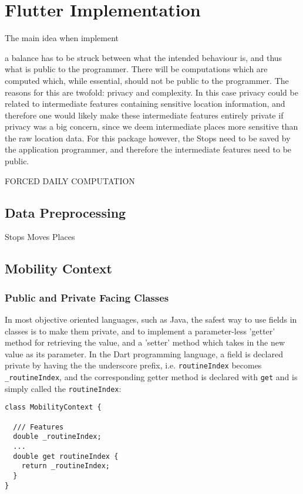 \section{Flutter Implementation}
The main idea when implement

a balance has to be struck between what the intended behaviour is, and thus what is public to the programmer. There will be computations which are computed which, while essential, should not be public to the programmer. The reasons for this are twofold: privacy and complexity. In this case privacy could be related to intermediate features containing sensitive location information, and therefore one would likely make these intermediate features entirely private if privacy was a big concern, since we deem intermediate places more sensitive than the raw location data. For this package however, the Stops need to be saved by the application programmer, and therefore the intermediate features need to be public. 

FORCED DAILY COMPUTATION

\subsection{Data Preprocessing}
Stops Moves Places

\subsection{Mobility Context}
\subsubsection{Public and Private Facing Classes}
In most objective oriented languages, such as Java, the safest way to use fields in classes is to make them private, and to implement a parameter-less 'getter' method for retrieving the value, and a 'setter' method which takes in the new value as its parameter. In the Dart programming language, a field is declared private by having the the underscore prefix, i.e. \verb|routineIndex| becomes \verb|_routineIndex|, and the corresponding getter method is declared with \verb|get| and is simply called the \verb|routineIndex|:

\begin{verbatim}
class MobilityContext {

  /// Features
  double _routineIndex;
  ...
  double get routineIndex {
    return _routineIndex;
  }
}
\end{verbatim}

